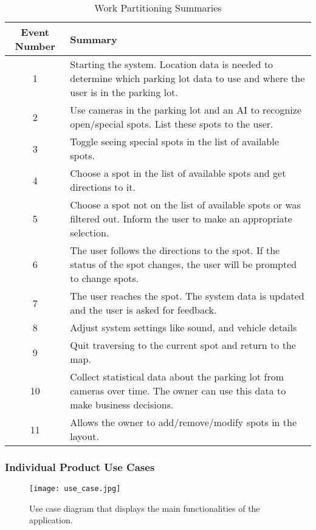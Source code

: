 \documentclass[12pt,letterpaper]{article}
\begin{document}
\begin{table}[h]
\caption{Work Partitioning Summaries}
    \centering
    \begin{tabular}{|c|p{10cm}|}
    \hline
    \textbf{Event Number} & \textbf{Summary} \\
    \hline
    1 & Starting the system. Location data is needed to determine which parking
    lot data to use and where the user is in the parking lot.\\
    \hline
    2 & Use cameras in the parking lot and an AI to recognize open/special
    spots. List these spots to the user.\\
    \hline
    3 & Toggle seeing special spots in the list of available spots.\\
    \hline
    4 & Choose a spot in the list of available spots and get directions to it.\\
    \hline
    5 & Choose a spot not on the list of available spots or was filtered out.
    Inform the user to make an appropriate selection.\\
    \hline
    6 & The user follows the directions to the spot. If the status of the spot
    changes, the user will be prompted to change spots.\\
    \hline
    7 & The user reaches the spot. The system data is updated and the user is
    asked for feedback.\\
    \hline
    8 & Adjust system settings like sound, and vehicle details\\
    \hline
    9 & Quit traversing to the current spot and return to the map.\\
    \hline
    10 & Collect statistical data about the parking lot from cameras over time.
    The owner can use this data to make business decisions.\\
    \hline
    11 & Allows the owner to add/remove/modify spots in the layout.\\
    \hline
    \end{tabular}
\end{table}

\newpage
\subsubsection{Individual Product Use Cases}

\begin{figure}[H]
    \centering
    \texttt{[image: use\_case.jpg]}
    \caption{Use case diagram that displays the main functionalities of the application.}
\end{figure}
\end{document}
